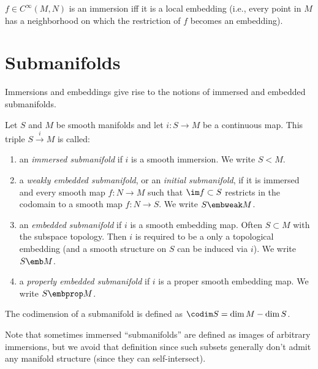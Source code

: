\begin{thm}\label{thm.local embedding}
$f\in C^\infty (M,N)$ is an immersion iff it is a local embedding (i.e., every point in $M$ has a neighborhood on which the restriction of $f$ becomes an embedding). 
\end{thm}


\section{Submanifolds}
Immersions and embeddings give rise to the notions of immersed and embedded submanifolds.

\begin{defn}[Submanifolds]
Let $S$ and $M$ be smooth manifolds and let $i:S\to M$ be a continuous map. This triple $S\overset{i}{\to}M$ is called:
\begin{enumerate}
    \item an \emph{immersed submanifold} if $i$ is a smooth immersion. We write $S<M$.\index{$<$}
    \item  a \emph{weakly embedded submanifold}, or an \emph{initial submanifold}, if it is immersed and every smooth map $f:N\to M$ such that $\im f\subset S$ restricts in the codomain to a smooth map $f:N\to S$. We write $S\embweak M$.
    \item an \emph{embedded submanifold} if $i$ is a smooth embedding map. Often $S\subset M$ with the subspace topology. Then $i$ is required to be a only a topological embedding (and a smooth structure on $S$ can be induced via $i$). We write $S\emb M$.\index{$\emb$}
    \item a \emph{properly embedded submanifold} if $i$ is a proper smooth embedding map. We write $S\embprop M$.\index{$\embprop$}
\end{enumerate}
The codimension  of a submanifold is defined as $\codim S=\dim M -\dim S$.
\end{defn}

Note that sometimes immersed ``submanifolds'' are defined as images of arbitrary immersions, but we avoid that definition since such subsets generally don't admit any manifold structure (since they can self-intersect).

